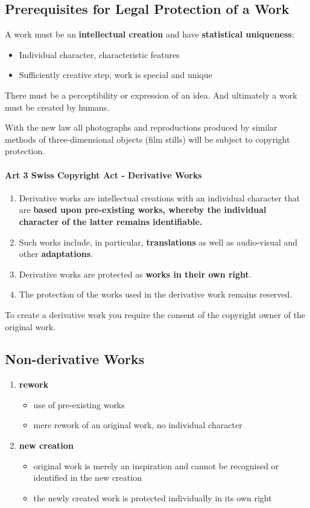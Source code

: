 \documentclass[11pt]{article}
\theoremstyle{definition}
\begin{document}
\subsection{Prerequisites for Legal Protection of a Work}
A work must be an \textbf{intellectual creation} and have \textbf{statistical uniqueness}:
\begin{itemize}
	\item Individual character, characteristic features
	\item Sufficiently creative step, work is special and unique
\end{itemize}

There must be a perceptibility or expression of an idea. And ultimately a work must be created by humans.

With the new law all photographs and reproductions produced by similar methods of three-dimensional objects (film stills) will be subject to copyright protection.

\paragraph{Art 3 Swiss Copyright Act - Derivative Works}
\begin{enumerate}[label=\arabic* ]
	\item Derivative works are intellectual creations with an individual character that are \textbf{based upon pre-existing works, whereby the individual character of the latter remains identifiable.}
	\item Such works include, in particular, \textbf{translations} as well as audio-visual and other \textbf{adaptations}.
	\item Derivative works are protected as \textbf{works in their own right}.
	\item The protection of the works used in the derivative work remains reserved.
\end{enumerate}

To create a derivative work you require the consent of the copyright owner of the original work.

\subsection{Non-derivative Works}
\begin{enumerate}[label=\arabic* ]
	\item \textbf{rework}
	\begin{itemize}
		\item use of pre-existing works
		\item mere rework of an original work, no individual character
	\end{itemize}
	\item \textbf{new creation}
	\begin{itemize}
		\item original work is merely an inspiration and cannot be recognised or identified in the new creation
		\item the newly created work is protected individually in its own right
	\end{itemize}
\end{enumerate}
\end{document}

